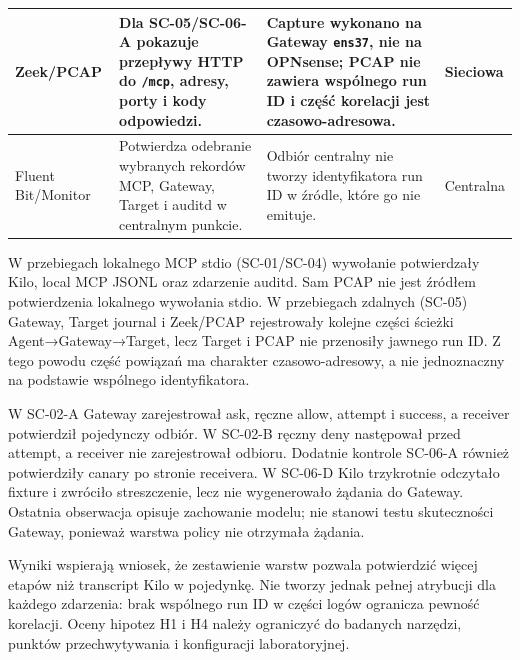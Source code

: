 \begin{table}[ht]
\begin{tabular}{|p{}|p{}|p{}|p{}|}
\hline
Zeek/PCAP & Dla SC-05/SC-06-A pokazuje przepływy HTTP do \texttt{/mcp}, adresy, porty i kody odpowiedzi. & Capture wykonano na Gateway \texttt{ens37}, nie na OPNsense; PCAP nie zawiera wspólnego run ID i część korelacji jest czasowo-adresowa. & Sieciowa \\
\hline
Fluent Bit/Monitor & Potwierdza odebranie wybranych rekordów MCP, Gateway, Target i auditd w centralnym punkcie. & Odbiór centralny nie tworzy identyfikatora run ID w źródle, które go nie emituje. & Centralna \\
\hline
\end{tabular}
\end{table}

W przebiegach lokalnego MCP stdio (SC-01/SC-04) wywołanie potwierdzały Kilo,
local MCP JSONL oraz zdarzenie auditd. Sam PCAP nie jest źródłem potwierdzenia
lokalnego wywołania stdio. W przebiegach zdalnych (SC-05) Gateway, Target
journal i Zeek/PCAP rejestrowały kolejne części ścieżki Agent→Gateway→Target,
lecz Target i PCAP nie przenosiły jawnego run ID. Z tego powodu część powiązań
ma charakter czasowo-adresowy, a nie jednoznaczny na podstawie wspólnego
identyfikatora.

W SC-02-A Gateway zarejestrował ask, ręczne allow, attempt i success, a receiver
potwierdził pojedynczy odbiór. W SC-02-B ręczny deny następował przed attempt,
a receiver nie zarejestrował odbioru. Dodatnie kontrole SC-06-A również
potwierdziły canary po stronie receivera. W SC-06-D Kilo trzykrotnie odczytało
fixture i zwróciło streszczenie, lecz nie wygenerowało żądania do Gateway.
Ostatnia obserwacja opisuje zachowanie modelu; nie stanowi testu skuteczności
Gateway, ponieważ warstwa policy nie otrzymała żądania.

Wyniki wspierają wniosek, że zestawienie warstw pozwala potwierdzić więcej
etapów niż transcript Kilo w pojedynkę. Nie tworzy jednak pełnej atrybucji dla
każdego zdarzenia: brak wspólnego run ID w części logów ogranicza pewność
korelacji. Oceny hipotez H1 i H4 należy ograniczyć do badanych narzędzi,
punktów przechwytywania i konfiguracji laboratoryjnej.

